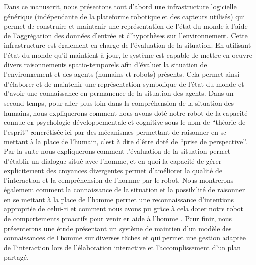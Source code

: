 \documentclass[a4paper,11pt,twoside]{StyleThese}
\begin{document}
Dans ce manuscrit, nous présentons tout d'abord une infrastructure logicielle générique (indépendante de la plateforme robotique et des capteurs utilisés) qui permet de construire et maintenir une représentation de l'état du monde à l'aide de l'aggrégation des données d'entrée et d'hypothèses sur l'environnement. Cette infrastructure est également en charge de l'évaluation de la situation. En utilisant l'état du monde qu'il maintient à jour, le système est capable de mettre en oeuvre divers raisonnements spatio-temporels afin d'évaluer la situation de l'environnement et des agents (humains et robots) présents. Cela permet ainsi d'élaborer et de maintenir une représentation symbolique de l'état du monde et d'avoir une connaissance en permanence de la situation des agents.
Dans un second temps, pour aller plus loin dans la compréhension de la situation des humains, nous expliquerons comment nous avons doté notre robot de la capacité connue en psychologie développementale et cognitive sous le nom de “théorie de l'esprit” concrétisée ici par des mécanismes permettant de raisonner en se mettant à la place de l'humain, c'est à dire d'être doté de “prise de perspective”.
Par la suite nous expliquerons comment l'évaluation de la situation permet d'établir un dialogue situé avec l'homme, et en quoi la capacité de gérer explicitement des croyances divergentes permet d'améliorer la qualité de l'interaction et la compréhension de l'homme par le robot.
Nous montrerons également comment la connaissance de la situation et la possibilité de raisonner en se mettant à la place de l'homme permet une reconnaissance d'intentions appropriée de celui-ci et comment nous avons pu grâce à cela doter notre robot de comportements proactifs pour venir en aide à l'homme .
Pour finir, nous présenterons une étude présentant un système de maintien d'un modèle des connaissances de l'homme sur diverses tâches et qui permet une gestion adaptée de l'interaction lors de l'élaboration interactive et l'accomplissement d'un plan partagé.

\ifdefined{}
\else


\end{document}
